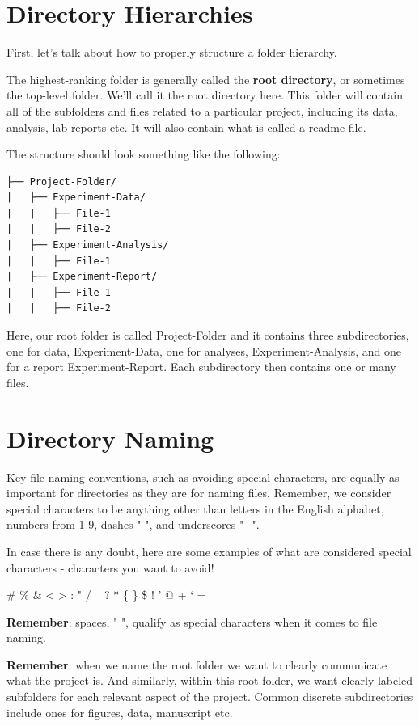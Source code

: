 \documentclass[
]{book}
\begin{document}
\hypertarget{directory-hierarchies}{%
\section{Directory Hierarchies}\label{directory-hierarchies}}

First, let's talk about how to properly structure a folder hierarchy.

The highest-ranking folder is generally called the \textbf{root directory}, or sometimes the top-level folder. We'll call it the root directory here. This folder will contain all of the subfolders and files related to a particular project, including its data, analysis, lab reports etc. It will also contain what is called a readme file.

The structure should look something like the following:

\begin{verbatim}
├── Project-Folder/
|   ├── Experiment-Data/
|   |   ├── File-1
|   |   ├── File-2
|   ├── Experiment-Analysis/
|   |   ├── File-1
|   ├── Experiment-Report/
|   |   ├── File-1
|   |   ├── File-2
\end{verbatim}

Here, our root folder is called Project-Folder and it contains three subdirectories, one for data, Experiment-Data, one for analyses, Experiment-Analysis, and one for a report Experiment-Report. Each subdirectory then contains one or many files.

\hypertarget{directory-naming}{%
\section{Directory Naming}\label{directory-naming}}

Key file naming conventions, such as avoiding special characters, are equally as important for directories as they are for naming files. Remember, we consider special characters to be anything other than letters in the English alphabet, numbers from 1-9, dashes "-", and underscores "\_".

In case there is any doubt, here are some examples of what are considered special characters - characters you want to avoid!

\# \% \& \textless{} \textgreater{} : " / ~\textbar{} ? * \{ \} \$ ! ' @ + ` =

\textbf{Remember}: spaces, " ", qualify as special characters when it comes to file naming.

\textbf{Remember}: when we name the root folder we want to clearly communicate what the project is. And similarly, within this root folder, we want clearly labeled subfolders for each relevant aspect of the project. Common discrete subdirectories include ones for figures, data, manuscript etc.
\end{document}
